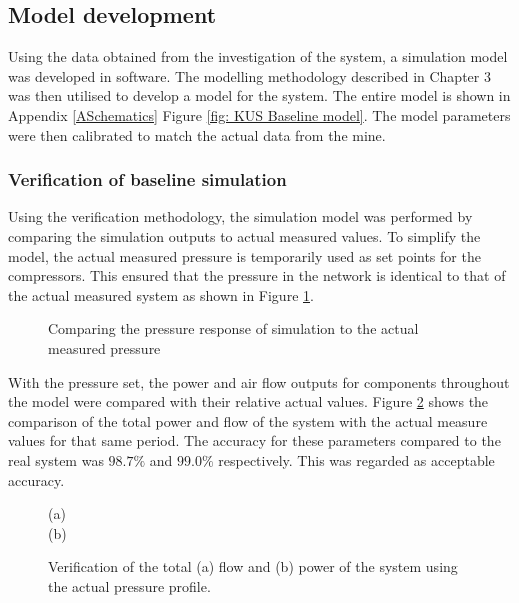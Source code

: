 	\subsection{Model development}
	
	Using the data obtained from the investigation of the system, a  simulation model was developed in software. The modelling methodology described in Chapter 3 was then utilised to develop a model for the system. The entire model is shown in Appendix \ref{ASchematics} Figure \ref{fig: KUS Baseline model}. The model parameters were then calibrated to match the actual data from the mine.
	
	\subsubsection{Verification of baseline simulation}
	Using the verification methodology, the simulation model was performed by comparing the simulation outputs to actual measured values. To simplify the model, the actual measured pressure is temporarily used as set points for the compressors. This ensured that the pressure in the network is identical to that of the actual measured system as shown in Figure \ref{fig: Verification Pressure kusasalethu}.
	
	\par 
	
	\begin{figure}[h]
		\centering
		
		\caption{Comparing the pressure response of simulation to the actual measured pressure}
		\label{fig: Verification Pressure kusasalethu}
	\end{figure}

 	With the pressure set, the power and air flow outputs for components throughout the model were compared with their relative actual values. Figure \ref{fig: Verification Power kusasalethu} shows the comparison of the total power and flow of the system with the actual measure values for that same period. The accuracy for these parameters compared to the real system was $98.7 \%$ and $99.0 \%$ respectively. This was regarded as acceptable accuracy. 
 
	\begin{figure}[h]
		\centering
		
		(a)\\
		
		(b)\\
		\caption{Verification of the total (a) flow and (b) power of the system using the actual pressure profile.}
		\label{fig: Verification Power kusasalethu}
	\end{figure}

